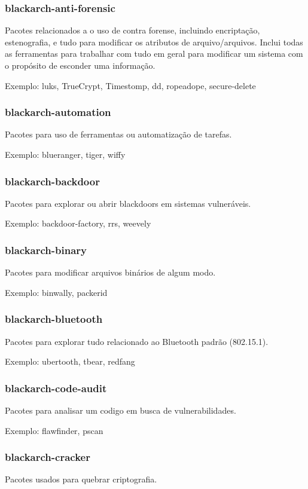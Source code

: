\documentclass[a4paper, oneside, 11pt]{book}
\begin{document}
\subsubsection{blackarch-anti-forensic}
Pacotes relacionados a o uso de contra forense, incluindo encriptação, estenografia, e tudo para modificar os atributos de arquivo/arquivos.
Inclui todas as ferramentas para trabalhar com tudo em geral para modificar um sistema com o propósito de esconder uma informação.

Exemplo: luks, TrueCrypt, Timestomp, dd, ropeadope, secure-delete

\subsubsection{blackarch-automation}
Pacotes para uso de ferramentas ou automatização de tarefas.

Exemplo: blueranger, tiger, wiffy

\subsubsection{blackarch-backdoor}
Pacotes para explorar ou abrir blackdoors em sistemas vulneráveis.

Exemplo: backdoor-factory, rrs, weevely

\subsubsection{blackarch-binary}
Pacotes para modificar arquivos binários de algum modo.

Exemplo: binwally, packerid

\subsubsection{blackarch-bluetooth}
Pacotes para explorar tudo relacionado ao Bluetooth padrão (802.15.1).

Exemplo: ubertooth, tbear, redfang

\subsubsection{blackarch-code-audit}
Pacotes para analisar um codigo em busca de vulnerabilidades.

Exemplo: flawfinder, pscan

\subsubsection{blackarch-cracker}
Pacotes usados para quebrar criptografia.
\end{document}
